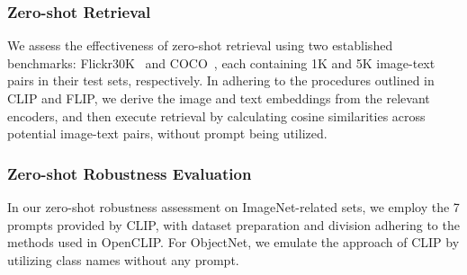 \subsubsection{Zero-shot Retrieval}
We assess the effectiveness of zero-shot retrieval using two established benchmarks: Flickr30K~\cite{young2014image} and COCO~\cite{lin2014microsoft}, each containing 1K and 5K image-text pairs in their test sets, respectively. In adhering to the procedures outlined in CLIP and FLIP, we derive the image and text embeddings from the relevant encoders, and then execute retrieval by calculating cosine similarities across potential image-text pairs, without prompt being utilized.

\subsubsection{Zero-shot Robustness Evaluation}
In our zero-shot robustness assessment on ImageNet-related sets, we employ the 7 prompts provided by CLIP, with dataset preparation and division adhering to the methods used in OpenCLIP. For ObjectNet, we emulate the approach of CLIP by utilizing class names without any prompt.

